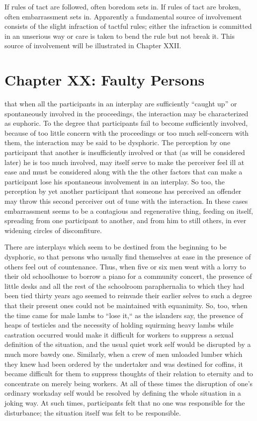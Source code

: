 \documentclass[twoside,symmetric,nobib,justified]{tufte-book}
\let\oldchapter\chapter
\def\chapter{%
  \setcounter{footnote}{0}%
  \oldchapter
}
\begin{document}
If rules of tact are followed, often boredom sets in. If rules of tact
are broken, often embarrassment sets in. Apparently a fundamental source
of involvement consists of the slight infraction of tactful rules;
either the infraction is committed in an unserious way or care is taken
to bend the rule but not break it. This source of involvement will be
illustrated in Chapter XXII.

\chapter[CHAPTER XX: FAULTY PERSONS]{Chapter XX: Faulty Persons}
\label{ch:Chapter XX: Faulty Persons}

 that when all the participants in an interplay are
sufficiently ``caught up'' or spontaneously involved in the proceedings,
the interaction may be characterized as euphoric. To the degree that
participants fail to become sufficiently involved, because of too little
concern with the proceedings or too much self-concern with them, the
interaction may be said to be dysphoric. The perception by one
participant that another is insufficiently involved or that (as will be
considered later) he is too much involved, may itself serve to make the
perceiver feel ill at ease and must be considered along with the the
other factors that can make a participant lose his spontaneous
involvement in an interplay. So too, the perception by yet another
participant that someone has perceived an offender may throw this second
perceiver out of tune with the interaction. In these cases embarrassment
seems to be a contagious and regenerative thing, feeding on itself,
spreading from one participant to another, and from him to still others,
in ever widening circles of discomfiture.

There are interplays which seem to be destined from the beginning to be
dysphoric, so that persons who usually find themselves at ease in the
presence of others feel out of countenance. Thus, when five or six men
went with a lorry to their old schoolhouse to borrow a piano for a
community concert, the presence of little desks and all the rest of the
schoolroom paraphernalia to which they had been tied thirty years ago
seemed to reinvade their earlier selves to such a degree that their
present ones could not be maintained with equanimity. So, too, when the
time came for male lambs to ``lose it,`` as the islanders say, the
presence of heaps of testicles and the necessity of holding squirming
heavy lambs while castration occurred would make it difficult for
workers to suppress a sexual definition of the situation, and the usual
quiet work self would be disrupted by a much more bawdy one. Similarly,
when a crew of men unloaded lumber which they knew had been ordered by
the undertaker and was destined for coffins, it became difficult for
them to suppress thoughts of their relation to eternity and to
concentrate on merely being workers. At all of these times the
disruption of one's ordinary workaday self would be resolved by defining
the whole situation in a joking way. At such times, participants felt
that no one was responsible for the disturbance; the situation itself
was felt to be responsible.
\end{document}
